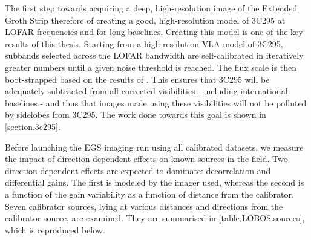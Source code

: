 \pg
The first step towards acquiring a deep, high-resolution image of the Extended Groth Strip therefore of creating a good, high-resolution model of 3C295 at LOFAR frequencies and for long baselines. Creating this model is one of the key results of this thesis. Starting from a high-resolution VLA model of 3C295, subbands selected across the LOFAR bandwidth are self-calibrated in iteratively greater numbers until a given noise threshold is reached. The flux scale is then boot-strapped based on the results of \citet{arse}. This ensures that 3C295 will be adequately subtracted from all corrected visibilities - including international baselines - and thus that images made using these visibilities will not be polluted by sidelobes from 3C295. 
The work done towards this goal is shown in \cref{section.3c295}. %
%

\pg
Before launching the EGS imaging run using all calibrated datasets, we measure the impact of direction-dependent effects on known sources in the field. Two direction-dependent effects are expected to dominate: decorrelation and differential gains. The first is modeled by the imager used, whereas the second is a function of the gain variability as a function of distance from the calibrator. Seven calibrator sources, lying at various distances and directions from the calibrator source, are examined. They are summarised in \cref{table.LOBOS.sources}, which is reproduced below.

